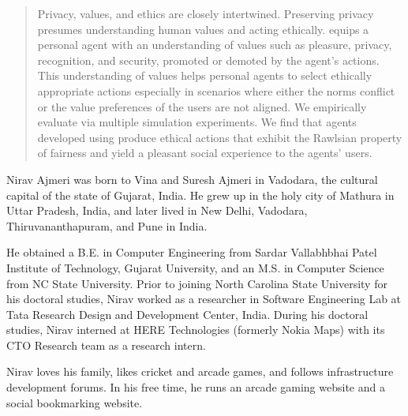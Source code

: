 \begin{abstract}
Privacy, values, and ethics are closely intertwined. Preserving privacy presumes  understanding human values and acting ethically. \frameworkAinur equips a personal agent with an understanding of values such as pleasure, privacy, recognition, and security, promoted or demoted by the agent's actions. This understanding of values helps personal agents to select ethically appropriate actions especially in scenarios where either the norms conflict or the value preferences of the users are not aligned.  We empirically evaluate \frameworkAinur via multiple simulation experiments. We find that agents developed using \frameworkAinur produce ethical actions that exhibit the Rawlsian property of fairness and yield a pleasant social experience to the agents' users.
\end{abstract}


\makecopyrightpage

\maketitlepage

\begin{dedication}
  \centering 
\end{dedication}

\begin{biography}
Nirav Ajmeri was born to Vina and Suresh Ajmeri in Vadodara, the cultural capital of the state of Gujarat, India. He grew up in the holy city of Mathura in Uttar Pradesh, India, and later lived in New Delhi, Vadodara, Thiruvananthapuram, and Pune in India. 

He obtained a B.E. in Computer Engineering from Sardar Vallabhbhai Patel Institute of Technology, Gujarat University, 
and an M.S. in Computer Science from NC State University. 
Prior to joining North Carolina State University for his doctoral studies, Nirav worked as a researcher in Software Engineering Lab at Tata Research Design and Development Center, India. During his doctoral studies, Nirav interned at HERE Technologies (formerly Nokia Maps) with its CTO Research team as a research intern. 

Nirav loves his family, likes cricket and arcade games, and follows infrastructure development forums. 
In his free time, he runs an arcade gaming website and a social bookmarking website. 
\end{biography}

